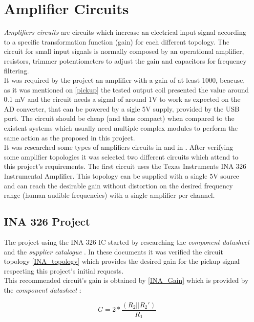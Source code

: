 \section{Amplifier Circuits}
\textit{Amplifiers circuits} \cite{amplifier-circuit} are circuits which increase
an electrical input signal according to a specific transformation function (gain)
for each different topology. The circuit for small input signals is normally
composed by an operational amplifier, resistors, trimmer potentiometers to adjust
the gain and capacitors for frequency filtering.\\
It was required by the project an amplifier with a gain of at least 1000, beacuse, as it was
mentioned on \autoref{pickup} the tested output coil presented the value around 0.1 mV and the
circuit needs a signal of around 1V to work as expected on the AD converter, that can be powered by a sigle 5V supply, provided by the USB port. The circuit
should be cheap (and thus compact) when compared to the existent systems which usually need
multiple complex modules to perform the same action as the proposed in this project. \\
It was researched some types of amplifiers circuits in 
and in . After verifying some amplifier topologies it was
selected two different circuits which attend to this project's requirements.
The first circuit uses the Texas Instruments INA 326 Instrumental Amplifier.%
This topology
can be supplied with a single 5V source and can reach the desirable gain without
distortion on the desired frequency range (human audible frequencies) with a single
amplifier per channel.\\

\subsection{INA 326 Project}
The project using the INA 326 IC started by researching the \textit{component datasheet}
\cite{INA326} and the \textit{supplier catalogue} \cite{OpAmps}. In these documents
it was verified the circuit topology \autoref{INA_topology} which provides the
desired gain for the pickup signal respecting this project's initial requests.\\
This recommended circuit's gain is obtained by \autoref{INA_Gain} which is
provided by the \textit{component datasheet} \cite{INA326}:

\begin{equation}
  \label{INA_Gain}
  G=2*\frac{(R_2||R_2 ')}{R_1}
\end{equation}

